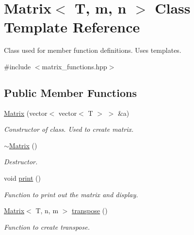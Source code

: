 \hypertarget{classMatrix}{}\section{Matrix$<$ T, m, n $>$ Class Template Reference}
\label{classMatrix}


Class used for member function definitions. Uses templates.  




{\ttfamily \#include $<$matrix\+\_\+functions.\+hpp$>$}

\subsection*{Public Member Functions}
\begin{DoxyCompactItemize}
\item 
\hyperlink{classMatrix_a48672cd6372a2bd80816321c0ffb8757}{Matrix} (vector$<$ vector$<$ T $>$ $>$ \&a)
\begin{DoxyCompactList}\small\item\em Constructor of class. Used to create matrix. \end{DoxyCompactList}\item 
\hyperlink{classMatrix_a0fc90e09b1eddc059e70881ad8f17ba2}{$\sim$\+Matrix} ()\hypertarget{classMatrix_a0fc90e09b1eddc059e70881ad8f17ba2}{}\label{classMatrix_a0fc90e09b1eddc059e70881ad8f17ba2}

\begin{DoxyCompactList}\small\item\em Destructor. \end{DoxyCompactList}\item 
void \hyperlink{classMatrix_ac161952679186c23c5785e5bcfef2cb7}{print} ()
\begin{DoxyCompactList}\small\item\em Function to print out the matrix and display. \end{DoxyCompactList}\item 
\hyperlink{classMatrix}{Matrix}$<$ T, n, m $>$ \hyperlink{classMatrix_a99567eedc9e9213b2047352e01f1abb4}{transpose} ()
\begin{DoxyCompactList}\small\item\em Function to create transpose. \end{DoxyCompactList}\end{DoxyCompactItemize}
